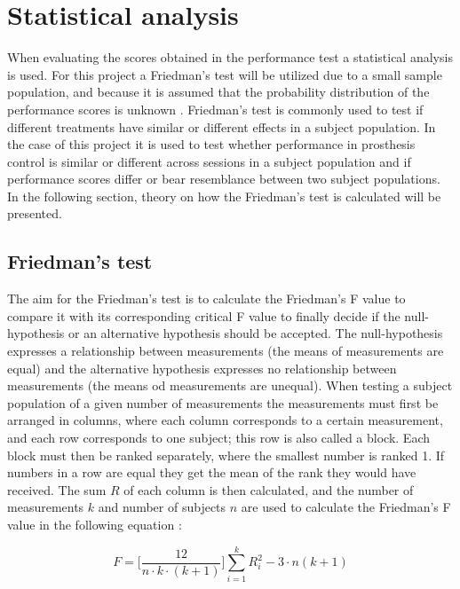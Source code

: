 \section{Statistical analysis}
When evaluating the scores obtained in the performance test a statistical analysis is used. For this project a Friedman's test will be utilized due to a small sample population, and because it is assumed that the probability distribution of the performance scores is unknown \cite{Zar2009}. Friedman's test is commonly used to test if different treatments have similar or different effects in a subject population. In the case of this project it is used to test whether performance in prosthesis control is similar or different across sessions in a subject population and if performance scores differ or bear resemblance between two subject populations. In the following section, theory on how the Friedman's test is calculated will be presented.

\subsection{Friedman's test}
The aim for the Friedman's test is to calculate the Friedman's F value to compare it with its corresponding critical F value to finally decide if the null-hypothesis or an alternative hypothesis should be accepted. The null-hypothesis expresses a relationship between measurements (the means of measurements are equal) and the alternative hypothesis expresses no relationship between measurements (the means od measurements are unequal).
When testing a subject population of a given number of measurements the measurements must first be arranged in columns, where each column corresponds to a certain measurement, and each row corresponds to one subject; this row is also called a block. Each block must then be ranked separately, where the smallest number is ranked 1. If numbers in a row are equal they get the mean of the rank they would have received. The sum $R$ of each column is then calculated, and the number of measurements $k$ and number of subjects $n$ are used to calculate the Friedman's F value in the following equation \cite{Zar2009}:

\begin{equation}
	F = \Big[\frac{12}{n \cdot k \cdot (k+1)}\Big] \sum_{i=1}^{k} R_{i}^{2} - 3 \cdot n(k + 1)
\end{equation}

